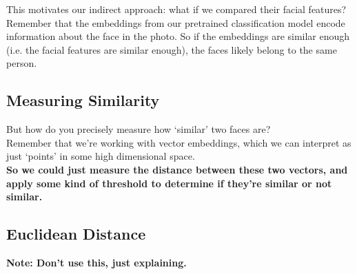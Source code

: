 \documentclass{article}
\begin{document}
This motivates our indirect approach: what if we compared their facial features? \\

Remember that the embeddings from our pretrained classification model encode information about the face in the photo. So if the embeddings are similar enough (i.e. the facial features are similar enough), the faces likely belong to the same person.






\subsection{Measuring Similarity}

But how do you precisely measure how `similar' two faces are? \\

Remember that we're working with vector embeddings, which we can interpret as just `points' in some high dimensional space. \\

\textbf{So we could just measure the distance between these two vectors, and apply some kind of threshold to determine if they're similar or not similar.}

\subsection{Euclidean Distance}
\textbf{Note: Don't use this, just explaining.} \\
\end{document}
